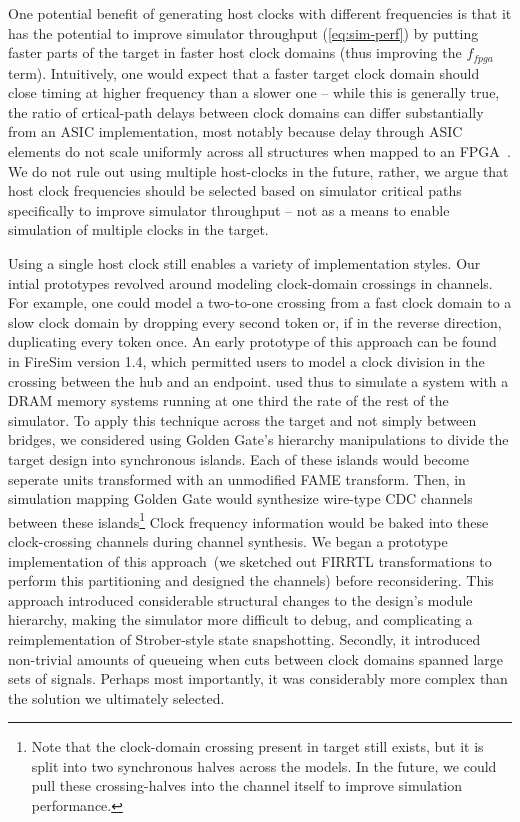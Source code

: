One potential benefit of generating host clocks with different frequencies is
that it has the potential to improve simulator throughput (\ref{eq:sim-perf})
by putting faster parts of the target in faster host clock domains (thus
improving the $f_{fpga}$ term). Intuitively, one would expect that a faster target clock
domain should close timing at higher frequency than a
slower one -- while this is generally true, the ratio of crtical-path delays
between clock domains can differ substantially from an ASIC implementation, most notably because delay through ASIC elements do
not scale uniformly across all structures when mapped to an FPGA~\cite{FPGAGap2}.
We do not rule out using multiple host-clocks in the future, rather, we
argue that host clock frequencies should be selected based on simulator
critical paths specifically to improve simulator throughput -- not as a means to enable
simulation of multiple clocks in the target.

Using a single host clock still enables a variety of implementation
styles. Our intial prototypes revolved around modeling clock-domain crossings
in channels. For example, one could model a two-to-one crossing from a fast clock
domain to a slow clock domain by dropping every second token or, if in the
reverse direction, duplicating every token once. An early prototype of this
approach can be found in FireSim version 1.4, which permitted users to
model a clock division in the crossing between the hub and an endpoint.
 used thus to simulate a system with a DRAM memory systems running
at one third the rate of the rest of the simulator. To apply this technique across
the target and not simply between bridges, we considered using Golden
Gate's hierarchy manipulations to divide the target design into synchronous
islands. Each of these islands would become seperate units transformed with an unmodified FAME transform.
Then, in simulation mapping Golden Gate would synthesize wire-type CDC channels between
these islands\footnote{Note that the clock-domain crossing present in target still
exists, but it is split into two synchronous halves across the models. In the future, we could
pull these crossing-halves into the channel itself to improve simulation
performance.} Clock frequency information would be baked into
these clock-crossing channels during channel synthesis. We began a prototype implementation of this
approach~(we sketched out FIRRTL transformations to perform this partitioning
and designed the channels) before reconsidering.  This approach introduced
considerable structural changes to the design's module hierarchy, making the
simulator more difficult to debug, and complicating a reimplementation of
Strober-style state snapshotting. Secondly, it introduced non-trivial
amounts of queueing when cuts between clock domains spanned large sets of signals.
Perhaps most importantly, it was considerably more complex than the solution we
ultimately selected.

